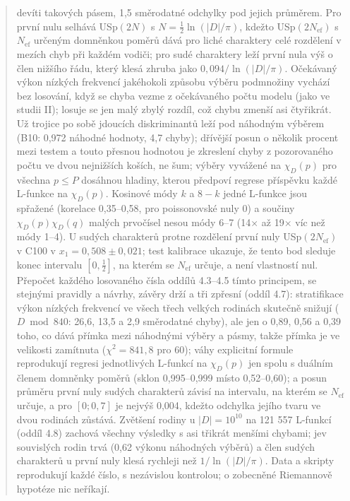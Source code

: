 \documentclass[
  10pt,
]{article}
\begin{document}
\begin{abstract}
devíti takových pásem, 1,5 směrodatné odchylky pod jejich průměrem. Pro
první nulu selhává USp\((2N)\) s \(N = \frac12\ln(|D|/\pi)\), kdežto
USp\((2N_{\mathrm{ef}})\) s \(N_{\mathrm{ef}}\) určeným domněnkou poměrů
dává pro liché charaktery celé rozdělení v mezích chyb při každém
vodiči; pro sudé charaktery leží první nula výš o člen nižšího řádu,
který klesá zhruba jako \(0{,}094/\ln(|D|/\pi)\). Očekávaný výkon
nízkých frekvencí jakéhokoli způsobu výběru podmnožiny vychází bez
losování, když se chyba vezme z očekávaného počtu modelu (jako ve studii
II); losuje se jen malý zbylý rozdíl, což chybu zmenší asi čtyřikrát. Už
trojice po sobě jdoucích diskriminantů leží pod náhodným výběrem (B10:
0,972 náhodné hodnoty, 4,7 chyby); dřívější posun o několik procent mezi
testem a touto přesnou hodnotou je zkreslení chyby z pozorovaného počtu
ve dvou nejnižších koších, ne šum; výběry vyvážené na \(\chi_D(p)\) pro
všechna \(p \le P\) dosáhnou hladiny, kterou předpoví regrese příspěvku
každé L-funkce na \(\chi_D(p)\). Kosinové módy \(k\) a \(8 - k\) jedné
L-funkce jsou spřažené (korelace 0,35--0,58, pro poissonovské nuly 0) a
součiny \(\chi_D(p)\chi_D(q)\) malých prvočísel nesou módy 6--7 (14× až
19× víc než módy 1--4). U sudých charakterů protne rozdělení první nuly
USp\((2N_{\mathrm{ef}})\) v C100 v \(x_1 = 0{,}508 \pm 0{,}021\); test
kalibrace ukazuje, že tento bod sleduje konec intervalu
\([0, \frac12]\), na kterém se \(N_{\mathrm{ef}}\) určuje, a není
vlastností nul. Přepočet každého losovaného čísla oddílů 4.3--4.5 tímto
principem, se stejnými pravidly a návrhy, závěry drží a tři zpřesní
(oddíl 4.7): stratifikace výkon nízkých frekvencí ve všech třech velkých
rodinách skutečně snižují (\(D \bmod 840\): 26,6, 13,5 a 2,9 směrodatné
chyby), ale jen o 0,89, 0,56 a 0,39 toho, co dává přímka mezi náhodnými
výběry a pásmy, takže přímka je ve velikosti zamítnuta
(\(\chi^2 = 841{,}8\) pro 60); váhy explicitní formule reprodukují
regresi jednotlivých L-funkcí na \(\chi_D(p)\) jen spolu s duálním
členem domněnky poměrů (sklon 0,995--0,999 místo 0,52--0,60); a posun
průměru první nuly sudých charakterů závisí na intervalu, na kterém se
\(N_{\mathrm{ef}}\) určuje, a pro \([0; 0{,}7]\) je nejvýš 0,004, kdežto
odchylka jejího tvaru ve dvou rodinách zůstává. Zvětšení rodiny u
\(|D| = 10^{10}\) na 121 557 L-funkcí (oddíl 4.8) zachová všechny
výsledky s asi třikrát menšími chybami; jev souvislých rodin trvá (0,62
výkonu náhodných výběrů) a člen sudých charakterů u první nuly klesá
rychleji než \(1/\ln(|D|/\pi)\). Data a skripty reprodukují každé číslo,
s nezávislou kontrolou; o zobecněné Riemannově hypotéze nic neříkají.
\end{abstract}
\end{document}

